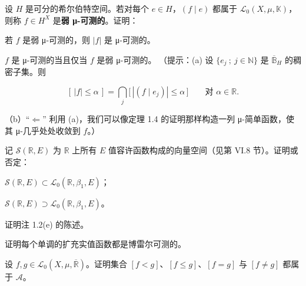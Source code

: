 \begin{exercises}
\item

设 $ H $ 是可分的希尔伯特空间。若对每个 $ e \in H $，$ (f \mid e) $ 都属于 $ \mathcal{L}_0(X,\mu,\mathbb{K}) $，则称 $ f \in H^{X} $ 是\textbf{弱 μ-可测的}。证明：

\begin{items}
\item

若 $ f $ 是弱 μ-可测的，则 $ |f| $ 是 μ-可测的。

\item

$ f $ 是 μ-可测的当且仅当 $ f $ 是弱 μ-可测的。
（提示：(a) 设 $ \{e_j \ ;\ j \in \mathbb{N}\} $ 是 $ \overline{\mathbb{B}}_H $ 的稠密子集。则

\[
[\,|f| \le \alpha\,] = \bigcap_{j}\big[\,|(f \mid e_j)| \le \alpha\,\big] \qquad \text{对 } \alpha \in \mathbb{R} .
\]
\end{items}

（b）“$ \Leftarrow $” 利用 (a)，我们可以像定理 1.4 的证明那样构造一列 μ-简单函数，使其 μ-几乎处处收敛到 $ f $。）

\item

记 $ \mathcal{S}(\mathbb{R},E) $ 为 $ \mathbb{R} $ 上所有 $ E $ 值容许函数构成的向量空间（见第 VI.8 节）。证明或否定：

\begin{items}
\item

$ \mathcal{S}(\mathbb{R},E) \subset \mathcal{L}_0(\mathbb{R},\beta_1,E) $；

\item

$ \mathcal{S}(\mathbb{R},E) \supset \mathcal{L}_0(\mathbb{R},\beta_1,E) $。

\end{items}

\item

证明注 1.2(e) 的陈述。

\item

证明每个单调的扩充实值函数都是博雷尔可测的。

\item

设 $ f, g \in \mathcal{L}_0(X,\mu,\overline{\mathbb{R}}) $。证明集合 $ [f<g] $、$ [f\le g] $、$ [f=g] $ 与 $ [f\ne g] $ 都属于 $ \mathcal{A} $。


\end{exercises}
